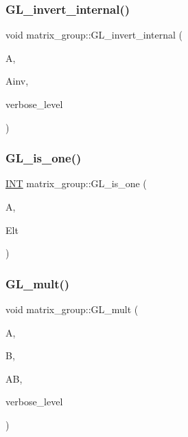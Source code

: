 \subsubsection{\texorpdfstring{G\+L\+\_\+invert\+\_\+internal()}{GL\_invert\_internal()}}
{\footnotesize\ttfamily void matrix\+\_\+group\+::\+G\+L\+\_\+invert\+\_\+internal (\begin{DoxyParamCaption}\item[{\mbox{\hyperlink{galois_8h_a09fddde158a3a20bd2dcadb609de11dc}{I\+NT}} $\ast$}]{A,  }\item[{\mbox{\hyperlink{galois_8h_a09fddde158a3a20bd2dcadb609de11dc}{I\+NT}} $\ast$}]{Ainv,  }\item[{\mbox{\hyperlink{galois_8h_a09fddde158a3a20bd2dcadb609de11dc}{I\+NT}}}]{verbose\+\_\+level }\end{DoxyParamCaption})}

\mbox{\label{classmatrix__group_ad2b498fce43b085fa40c2efbc8dd7fd7}} 
\subsubsection{\texorpdfstring{G\+L\+\_\+is\+\_\+one()}{GL\_is\_one()}}
{\footnotesize\ttfamily \mbox{\hyperlink{galois_8h_a09fddde158a3a20bd2dcadb609de11dc}{I\+NT}} matrix\+\_\+group\+::\+G\+L\+\_\+is\+\_\+one (\begin{DoxyParamCaption}\item[{\mbox{\hyperlink{classaction}{action}} \&}]{A,  }\item[{\mbox{\hyperlink{galois_8h_a09fddde158a3a20bd2dcadb609de11dc}{I\+NT}} $\ast$}]{Elt }\end{DoxyParamCaption})}

\mbox{\label{classmatrix__group_a21bccc677704730243372ba8431356e8}} 
\subsubsection{\texorpdfstring{G\+L\+\_\+mult()}{GL\_mult()}}
{\footnotesize\ttfamily void matrix\+\_\+group\+::\+G\+L\+\_\+mult (\begin{DoxyParamCaption}\item[{\mbox{\hyperlink{galois_8h_a09fddde158a3a20bd2dcadb609de11dc}{I\+NT}} $\ast$}]{A,  }\item[{\mbox{\hyperlink{galois_8h_a09fddde158a3a20bd2dcadb609de11dc}{I\+NT}} $\ast$}]{B,  }\item[{\mbox{\hyperlink{galois_8h_a09fddde158a3a20bd2dcadb609de11dc}{I\+NT}} $\ast$}]{AB,  }\item[{\mbox{\hyperlink{galois_8h_a09fddde158a3a20bd2dcadb609de11dc}{I\+NT}}}]{verbose\+\_\+level }\end{DoxyParamCaption})}

